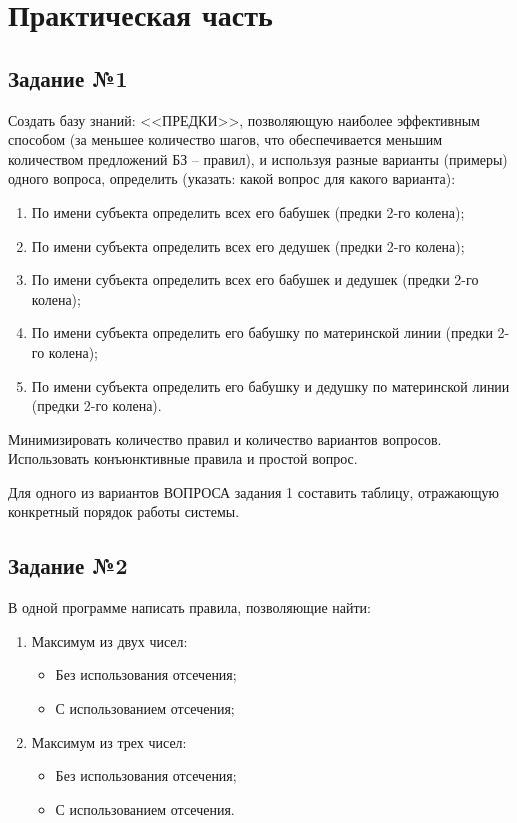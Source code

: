 \setcounter{page}{3}

\chapter{Практическая часть}
\section{Задание №1}
Создать базу знаний: <<ПРЕДКИ>>, позволяющую наиболее эффективным способом (за меньшее количество шагов, что обеспечивается меньшим количеством предложений БЗ – правил), и используя разные варианты (примеры) одного вопроса, определить (указать: какой вопрос для какого варианта):

\begin{enumerate}
	\item По имени субъекта определить всех его бабушек (предки 2-го колена);
	\item По имени субъекта определить всех его дедушек (предки 2-го колена);
	\item По имени субъекта определить всех его бабушек и дедушек (предки 2-го колена);
	\item По имени субъекта определить его бабушку по материнской линии (предки 2-го колена);
	\item По имени субъекта определить его бабушку и дедушку по материнской линии (предки 2-го колена).
\end{enumerate}

Минимизировать количество правил и количество вариантов вопросов. Использовать конъюнктивные правила и простой вопрос.

Для одного из вариантов ВОПРОСА задания 1 составить таблицу, отражающую конкретный порядок работы системы.


\section{Задание №2}
В одной программе написать правила, позволяющие найти:

\begin{enumerate}
	\item Максимум из двух чисел:
	\begin{itemize}
		\item Без использования отсечения;
		\item С использованием отсечения;
	\end{itemize}
	\item Максимум из трех чисел:
	\begin{itemize}
		\item Без использования отсечения;
		\item С использованием отсечения.
	\end{itemize}
\end{enumerate}

